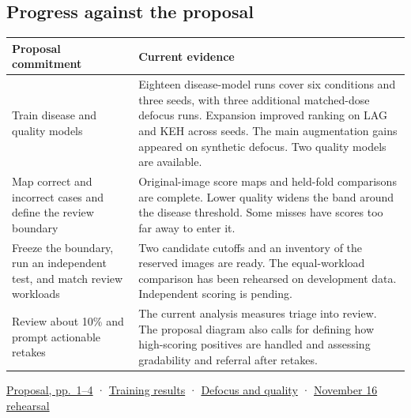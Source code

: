 \documentclass[
  10pt,
]{article}
\newcounter{none} %
\begin{document}
\subsection{Progress against the
proposal}\label{progress-against-the-proposal}

{\def\LTcaptype{none} %
\begin{longtable}[]{@{}
  >{\raggedright\arraybackslash}p{}
  >{\raggedright\arraybackslash}p{}@{}}
\toprule\noalign{}
\begin{minipage}[b]{\linewidth}\raggedright
Proposal commitment
\end{minipage} & \begin{minipage}[b]{\linewidth}\raggedright
Current evidence
\end{minipage} \\
\midrule\noalign{}
\endhead
\bottomrule\noalign{}
\endlastfoot
Train disease and quality models & Eighteen disease-model runs cover six
conditions and three seeds, with three additional matched-dose defocus
runs. Expansion improved ranking on LAG and KEH across seeds. The main
augmentation gains appeared on synthetic defocus. Two quality models are
available. \\
Map correct and incorrect cases and define the review boundary &
Original-image score maps and held-fold comparisons are complete. Lower
quality widens the band around the disease threshold. Some misses have
scores too far away to enter it. \\
Freeze the boundary, run an independent test, and match review workloads
& Two candidate cutoffs and an inventory of the reserved images are
ready. The equal-workload comparison has been rehearsed on development
data. Independent scoring is pending. \\
Review about 10\% and prompt actionable retakes & The current analysis
measures triage into review. The proposal diagram also calls for
defining how high-scoring positives are handled and assessing
gradability and referral after retakes. \\
\end{longtable}
}

\href{../../../proposal-1106.pdf}{Proposal, pp.~1--4} ·
\href{../2026-11-15/completed-experiments/completed-results.en.md}{Training
results} · \href{../2026-11-16/quality-alignment.en.md}{Defocus and
quality} · \href{../2026-11-16/proposal-review.en.md}{November 16
rehearsal}
\end{document}
